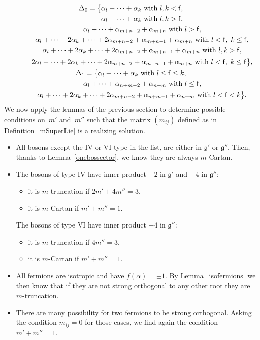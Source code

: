 \documentclass[pdftex]{sigma}%
\numberwithin{equation}{section}
\newcommand{\f}{\mathsf{f}}
\begin{document}
\begin{gather*}
\Delta_0 =  \big\lbrace \alpha_l+ \dots +\alpha_k \ \text{with } l,k<\f,  \\
\hphantom{\Delta_0 =  \big\lbrace}{}  \alpha_l+ \dots +\alpha_k \ \text{with } l,k > \f, \\
\hphantom{\Delta_0 =  \big\lbrace}{}\alpha_l+ \dots +\alpha_{m+n-2}+\alpha_{m+n} \ \text{with } l > \f,\\
\hphantom{\Delta_0 =  \big\lbrace}{}\alpha_l+ \dots +2\alpha_{k}+\dots +2\alpha_{m+n-2} +\alpha_{m+n-1}+\alpha_{m+n} \ \text{with } l < \f, \  k\leq \f,\\
\hphantom{\Delta_0 =  \big\lbrace}{}\alpha_l+ \dots +2\alpha_{k}+\dots +2\alpha_{m+n-2} +\alpha_{m+n-1}+\alpha_{m+n} \ \text{with } l,k > \f, \\
\hphantom{\Delta_0 =  \big\lbrace}{}2\alpha_l+ \dots +2\alpha_{k}+\dots +2\alpha_{m+n-2} +\alpha_{m+n-1}+\alpha_{m+n} \ \text{with } l < \f,\  k\leq \f\big\rbrace,\\
\Delta_1 =  \big\lbrace \alpha_l+ \dots +\alpha_{k} \ \text{with } l\leq \f \leq k,\\
\hphantom{\Delta_1 =  \big\lbrace}{}
\alpha_l+ \dots +\alpha_{n+m-2}+\alpha_{n+m} \ \text{with } l\leq \f, \\
\hphantom{\Delta_1 =  \big\lbrace}{} \alpha_l+ \dots +2\alpha_{k}+\dots +2\alpha_{m+n-2}+\alpha_{n+m-1}+\alpha_{n+m} \ \text{with } l < \f<k\big\rbrace.
\end{gather*}
We now apply the lemmas of the previous section to determine possible conditions on~$m'$ and~$m''$ such that the matrix $(m_{ij})$ defined as in Definition~\ref{mSuperLie} is a realizing solution.
\begin{itemize}\itemsep=0pt
	\item All bosons except the IV or VI type in the list, are either in $\mathfrak{g'}$ or $\mathfrak{g''}$. Then, thanks to Lemma~\ref{onebossector}, we know they are always $m$-Cartan.
	\item The bosons of type IV have inner product $-2$ in $\mathfrak{g'}$ and $-4$ in $\mathfrak{g''}$:
	\begin{itemize}\itemsep=0pt
		\item it is $m$-truncation if $2m' +4m'' =3$,
	\item it is $m$-Cartan if $m'+m'' = 1$.
	\end{itemize}
	 The bosons of type VI have inner product $-4$ in $\mathfrak{g''}$:
	\begin{itemize}\itemsep=0pt
		\item it is $m$-truncation if $4m'' =3$,
	\item it is $m$-Cartan if $m'+m'' = 1$.
	\end{itemize}
	\item All fermions are isotropic and have $f(\alpha)= \pm 1$. By Lemma~\ref{isofermions} we then know that if they are not strong orthogonal to any other root they are $m$-truncation.
	\item There are many possibility for two fermions to be strong orthogonal. Asking the condition $m_{ij} = 0$ for those cases, we find again the condition $m' + m'' = 1$.
\end{itemize}
\end{document}
